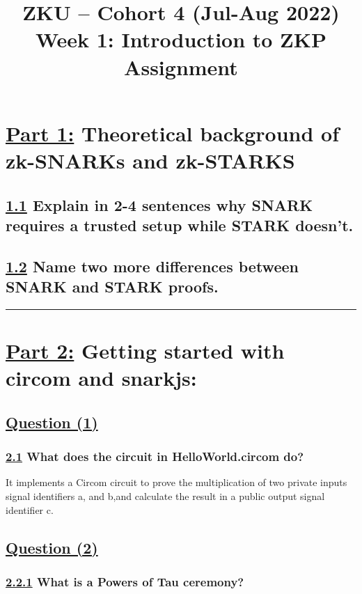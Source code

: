 \documentclass[letterpaper, 10 pt, conference]{ieeeconf}  %
\title{\LARGE \bf
ZKU – Cohort 4 (Jul-Aug 2022)\\Week 1: Introduction to ZKP\\Assignment \sharp 1}
\author{Iskander Andrews\\Isk#0996}
\begin{document}
\maketitle
\thispagestyle{empty}
\pagestyle{empty}


\section{\textbf{\underline{Part 1:}} Theoretical background of zk-SNARKs and zk-STARKS}
\subsection{\textbf{\underline{1.1} Explain in 2-4 sentences why SNARK requires a trusted setup while STARK doesn’t.}}

\subsection{\textbf{\underline{1.2} Name two more differences between SNARK and STARK proofs.}}

\noindent\rule{8cm}{0.4pt}

\section{\textbf{\underline{Part 2:}} Getting started with circom and snarkjs:}
\subsection{\textbf{\underline{Question (1)}}}
\subsubsection{\textbf{\underline{2.1} What does the circuit in HelloWorld.circom do?}}

It implements a Circom circuit to prove the multiplication of two private inputs signal identifiers a, and b,and calculate the result in a public output signal identifier c. 

\subsection{\textbf{\underline{Question (2)}}}
\subsubsection{\textbf{\underline{2.2.1} What is a Powers of Tau ceremony?}}
\end{document}
